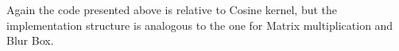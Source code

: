 	Again the code presented above is relative to Cosine kernel, but the implementation structure is analogous to the one for Matrix multiplication and Blur Box.
	
	
	



